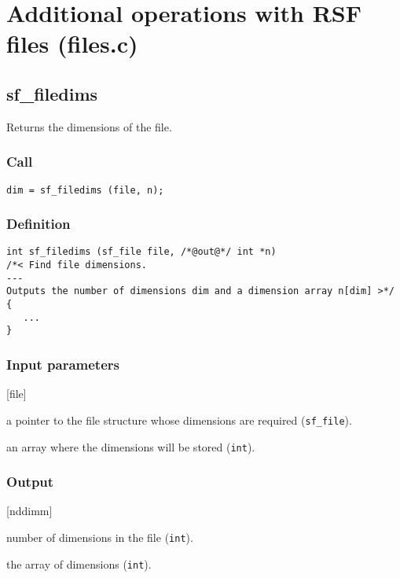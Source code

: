 \section{Additional operations with RSF files (files.c)}




\subsection{{sf\_filedims}}\label{sec:sf_filedims}
Returns the dimensions of the file.

\subsubsection*{Call}
\begin{verbatim}dim = sf_filedims (file, n);\end{verbatim}

\subsubsection*{Definition}
\begin{verbatim}
int sf_filedims (sf_file file, /*@out@*/ int *n) 
/*< Find file dimensions.
--- 
Outputs the number of dimensions dim and a dimension array n[dim] >*/
{
   ...
}
\end{verbatim}

\subsubsection*{Input parameters}
\begin{desclist}{\tt}{\quad}[file]
   \setlength\itemsep{0pt}
   \item[file] a pointer to the file structure whose dimensions are required (\texttt{sf\_file}). 
   \item[n]    an array where the dimensions will be stored (\texttt{int}).
\end{desclist}

\subsubsection*{Output}
\begin{desclist}{}{\quad}[nddimm]
   \setlength\itemsep{0pt}
   \item[\texttt{dim}] number of dimensions in the file (\texttt{int}). 
   \item[\texttt{n[dim]}] the array of dimensions (\texttt{int}).
\end{desclist}




